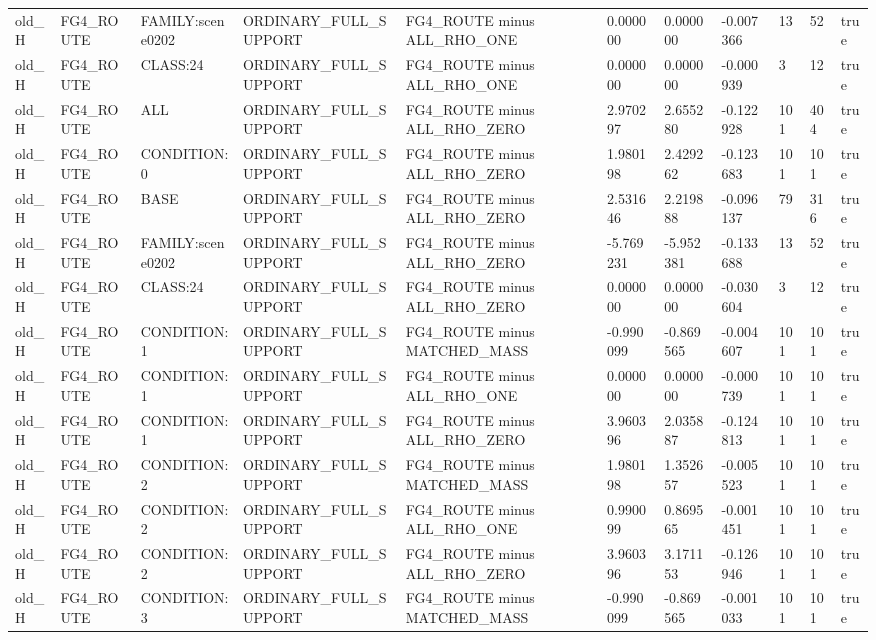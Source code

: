 \begin{tabular}{lllllllllll}
old\_H & FG4\_ROUTE & FAMILY:scene0202 & ORDINARY\_FULL\_SUPPORT & FG4\_ROUTE minus ALL\_RHO\_ONE & 0.000000 & 0.000000 & -0.007366 & 13 & 52 & true \\
old\_H & FG4\_ROUTE & CLASS:24 & ORDINARY\_FULL\_SUPPORT & FG4\_ROUTE minus ALL\_RHO\_ONE & 0.000000 & 0.000000 & -0.000939 & 3 & 12 & true \\
old\_H & FG4\_ROUTE & ALL & ORDINARY\_FULL\_SUPPORT & FG4\_ROUTE minus ALL\_RHO\_ZERO & 2.970297 & 2.655280 & -0.122928 & 101 & 404 & true \\
old\_H & FG4\_ROUTE & CONDITION:0 & ORDINARY\_FULL\_SUPPORT & FG4\_ROUTE minus ALL\_RHO\_ZERO & 1.980198 & 2.429262 & -0.123683 & 101 & 101 & true \\
old\_H & FG4\_ROUTE & BASE & ORDINARY\_FULL\_SUPPORT & FG4\_ROUTE minus ALL\_RHO\_ZERO & 2.531646 & 2.219888 & -0.096137 & 79 & 316 & true \\
old\_H & FG4\_ROUTE & FAMILY:scene0202 & ORDINARY\_FULL\_SUPPORT & FG4\_ROUTE minus ALL\_RHO\_ZERO & -5.769231 & -5.952381 & -0.133688 & 13 & 52 & true \\
old\_H & FG4\_ROUTE & CLASS:24 & ORDINARY\_FULL\_SUPPORT & FG4\_ROUTE minus ALL\_RHO\_ZERO & 0.000000 & 0.000000 & -0.030604 & 3 & 12 & true \\
old\_H & FG4\_ROUTE & CONDITION:1 & ORDINARY\_FULL\_SUPPORT & FG4\_ROUTE minus MATCHED\_MASS & -0.990099 & -0.869565 & -0.004607 & 101 & 101 & true \\
old\_H & FG4\_ROUTE & CONDITION:1 & ORDINARY\_FULL\_SUPPORT & FG4\_ROUTE minus ALL\_RHO\_ONE & 0.000000 & 0.000000 & -0.000739 & 101 & 101 & true \\
old\_H & FG4\_ROUTE & CONDITION:1 & ORDINARY\_FULL\_SUPPORT & FG4\_ROUTE minus ALL\_RHO\_ZERO & 3.960396 & 2.035887 & -0.124813 & 101 & 101 & true \\
old\_H & FG4\_ROUTE & CONDITION:2 & ORDINARY\_FULL\_SUPPORT & FG4\_ROUTE minus MATCHED\_MASS & 1.980198 & 1.352657 & -0.005523 & 101 & 101 & true \\
old\_H & FG4\_ROUTE & CONDITION:2 & ORDINARY\_FULL\_SUPPORT & FG4\_ROUTE minus ALL\_RHO\_ONE & 0.990099 & 0.869565 & -0.001451 & 101 & 101 & true \\
old\_H & FG4\_ROUTE & CONDITION:2 & ORDINARY\_FULL\_SUPPORT & FG4\_ROUTE minus ALL\_RHO\_ZERO & 3.960396 & 3.171153 & -0.126946 & 101 & 101 & true \\
old\_H & FG4\_ROUTE & CONDITION:3 & ORDINARY\_FULL\_SUPPORT & FG4\_ROUTE minus MATCHED\_MASS & -0.990099 & -0.869565 & -0.001033 & 101 & 101 & true \\

\end{tabular}

